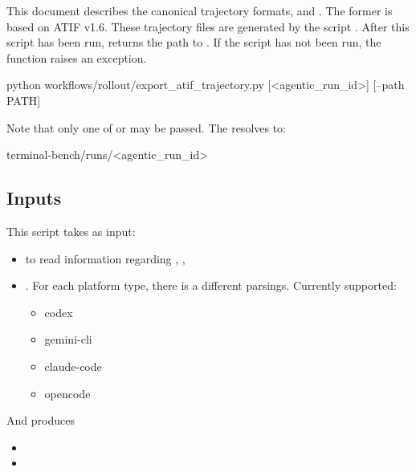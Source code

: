 \documentclass[11pt]{article}
\begin{document}
\label{docstart:atif_transcription}

This document describes the canonical trajectory formats,  and . The former is based on ATIF v1.6.
These trajectory files are generated by the script .
After this script has been run,  returns the path to . If the script has not been run, the function raises an exception.

\begin{DocCode}
python workflows/rollout/export_atif_trajectory.py [<agentic_run_id>] [--path PATH]
\end{DocCode}
Note that only one of  or  may be passed.
The  resolves to:
\begin{DocCode}
terminal-bench/runs/<agentic_run_id>
\end{DocCode}

\subsection{Inputs}
This script takes as input:
\begin{itemize}
  \item {} to read information regarding , , 
  \item {}.
  For each platform type, there is a different parsings. Currently supported:
  \begin{itemize}
    \item codex
    \item gemini-cli
    \item claude-code
    \item opencode
  \end{itemize}
\end{itemize}

And produces
\begin{itemize}
  \item {}
  \item {}
\end{itemize}
\end{document}
